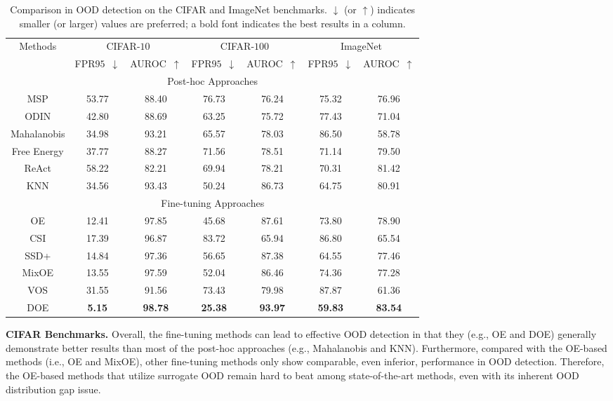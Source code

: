 \documentclass{article} \usepackage{iclr2022_conference,times}
\begin{document}
\begin{table}[t]
\caption{Comparison in OOD detection on the CIFAR and ImageNet benchmarks. $\downarrow$ (or $\uparrow$) indicates smaller (or larger) values are preferred; a bold font indicates the best results in a column.} \label{tab: cifar&imagenet}
\small
\centering
\begin{tabular}{c|cc|cc|cc}
\toprule[1.5pt]
\multirow{2}{*}{Methods} & \multicolumn{2}{c|}{CIFAR-$10$} & \multicolumn{2}{c}{CIFAR-$100$} & \multicolumn{2}{|c}{ImageNet}\\
\cline{2-7} 
         & FPR$95$~$\downarrow$ & AUROC~$\uparrow$  & FPR$95$~$\downarrow$ & AUROC~$\uparrow$ & FPR$95$~$\downarrow$ & AUROC~$\uparrow$ \\
\midrule[1pt]
\multicolumn{7}{c}{Post-hoc Approaches} \\
\midrule[0.6pt]
MSP   & 53.77 & 88.40 & 76.73 & 76.24 & 75.32 & 76.96 \\
ODIN  & 42.80 & 88.69 & 63.25 & 75.72 & 77.43 & 71.04 \\  
Mahalanobis 
      & 34.98 & 93.21 & 65.57 & 78.03 & 86.50 & 58.78 \\
Free Energy 
      & 37.77 & 88.27 & 71.56 & 78.51 & 71.14 & 79.50 \\
ReAct & 58.22 & 82.21 & 69.94 & 78.21 & 70.31 & 81.42 \\
KNN   & 34.56 & 93.43 & 50.24 & 86.73 & 64.75 & 80.91 \\    
\midrule[0.6pt]
\multicolumn{7}{c}{{Fine-tuning Approaches}} \\
\midrule[0.6pt]
OE    & 12.41 & 97.85 & 45.68 & 87.61 & 73.80 & 78.90 \\
CSI   & 17.39 & 96.87 & 83.72 & 65.94 & 86.80 & 65.54 \\
SSD+  & 14.84 & 97.36 & 56.65 & 87.38 & 64.55 & 77.46 \\
MixOE & 13.55 & 97.59 & 52.04 & 86.46 & 74.36 & 77.28 \\
VOS   & 31.55 & 91.56 & 73.43 & 79.98 & 87.87 & 61.36 \\
\hline
DOE   & \textbf{5.15} & \textbf{98.78} & \textbf{25.38} & \textbf{93.97} & \textbf{59.83} & \textbf{83.54} \\
\bottomrule[1.5pt]   
\end{tabular}
\end{table}




\textbf{CIFAR Benchmarks.} Overall, the fine-tuning methods can lead to effective OOD detection in that they (e.g., OE and DOE) generally demonstrate better results than most of the post-hoc approaches (e.g., Mahalanobis and KNN). Furthermore, compared with the OE-based methods (i.e., OE and MixOE), other fine-tuning methods only show comparable, even inferior, performance in OOD detection. Therefore, the OE-based methods that utilize surrogate OOD remain hard to beat among state-of-the-art methods, even with its inherent OOD distribution gap issue. 
\end{document}
